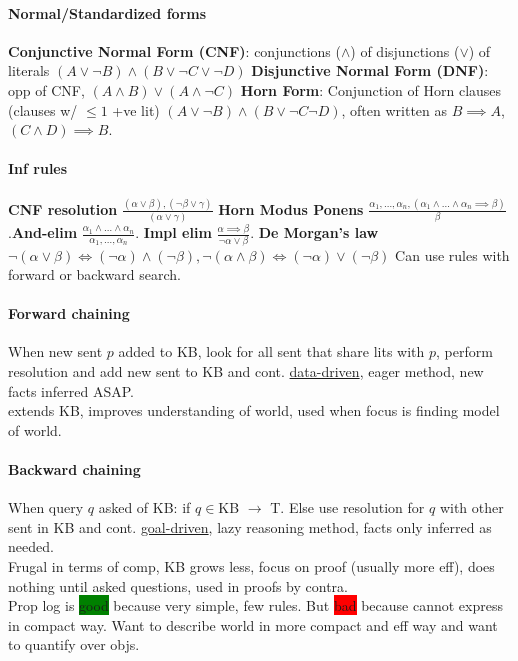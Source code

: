\paragraph{Normal/Standardized forms}
\textbf{Conjunctive Normal Form (CNF)}: conjunctions ($\land$) of
disjunctions ($\lor$)
of literals $(A \lor \neg B) \land (B \lor \neg C \lor \neg D)$
\textbf{Disjunctive Normal Form (DNF)}: opp of CNF, $(A \land B) \lor
(A \land \neg C)$
\textbf{Horn Form}: Conjunction of Horn clauses (clauses w/ $\leq 1$
+ve lit) $(A \lor \neg B)\land (B \lor \neg C \neg D)$, often written
as $B \implies A$, $(C \land D)\implies B$.
\paragraph{Inf rules} \textbf{CNF resolution} $\frac{(\alpha \lor
  \beta), (\neg \beta \lor \gamma)}{(\alpha \lor \gamma)}$
\textbf{Horn Modus Ponens} $\frac{\alpha_1, \ldots, \alpha_n,
  (\alpha_1 \land \ldots \land \alpha_n \implies
  \beta)}{\beta}$.\textbf{And-elim} $\frac{\alpha_1 \land \ldots \land
  \alpha_n}{\alpha_1, \ldots ,\alpha_n}$. \textbf{Impl elim}
$\frac{\alpha \implies \beta}{\neg \alpha \lor \beta}$. \textbf{De
  Morgan's law} $\neg(\alpha \lor \beta)\iff (\neg \alpha)\land (\neg
\beta), \neg(\alpha \land \beta)\iff (\neg \alpha) \lor (\neg \beta)$
Can
use rules with forward or backward search. 
\paragraph{Forward chaining} When new sent $p$ added to KB, look for
all sent that share lits with $p$, perform resolution and add new sent
to KB and cont. \underline{data-driven}, eager method, new facts
inferred ASAP.
\\ extends KB, improves understanding of world, used when focus is
finding model of world.
\paragraph{Backward chaining} When query $q$ asked of KB: if $q\in$KB
$\to$ T. Else use resolution for $q$ with other sent in KB and
cont. \underline{goal-driven}, lazy reasoning method, facts only
inferred as needed.
\\ Frugal in terms of comp, KB grows less, focus on proof (usually
more eff), does nothing until asked questions, used in proofs by
contra.
\\ Prop log is \colorbox{green}{good} because very simple, few
rules. But \colorbox{red}{bad} because cannot express in compact
way. Want to describe world in more compact and eff way and want to
quantify over objs.
